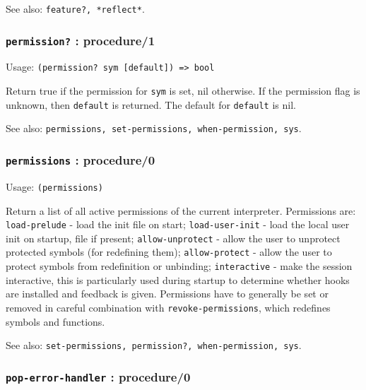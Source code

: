 \documentclass[
]{article}
\newcommand{\passthrough}[1]{#1}
\begin{document}
See also: \passthrough{\lstinline!feature?, *reflect*!}.

\hypertarget{permission-procedure1}{%
\subsubsection{\texorpdfstring{\texttt{permission?} :
procedure/1}{permission? : procedure/1}}\label{permission-procedure1}}

Usage: \passthrough{\lstinline!(permission? sym [default]) => bool!}

Return true if the permission for \passthrough{\lstinline!sym!} is set,
nil otherwise. If the permission flag is unknown, then
\passthrough{\lstinline!default!} is returned. The default for
\passthrough{\lstinline!default!} is nil.

See also:
\passthrough{\lstinline!permissions, set-permissions, when-permission, sys!}.

\hypertarget{permissions-procedure0}{%
\subsubsection{\texorpdfstring{\texttt{permissions} :
procedure/0}{permissions : procedure/0}}\label{permissions-procedure0}}

Usage: \passthrough{\lstinline!(permissions)!}

Return a list of all active permissions of the current interpreter.
Permissions are: \passthrough{\lstinline!load-prelude!} - load the init
file on start; \passthrough{\lstinline!load-user-init!} - load the local
user init on startup, file if present;
\passthrough{\lstinline!allow-unprotect!} - allow the user to unprotect
protected symbols (for redefining them);
\passthrough{\lstinline!allow-protect!} - allow the user to protect
symbols from redefinition or unbinding;
\passthrough{\lstinline!interactive!} - make the session interactive,
this is particularly used during startup to determine whether hooks are
installed and feedback is given. Permissions have to generally be set or
removed in careful combination with
\passthrough{\lstinline!revoke-permissions!}, which redefines symbols
and functions.

See also:
\passthrough{\lstinline!set-permissions, permission?, when-permission, sys!}.

\hypertarget{pop-error-handler-procedure0}{%
\subsubsection{\texorpdfstring{\texttt{pop-error-handler} :
procedure/0}{pop-error-handler : procedure/0}}\label{pop-error-handler-procedure0}}
\end{document}
